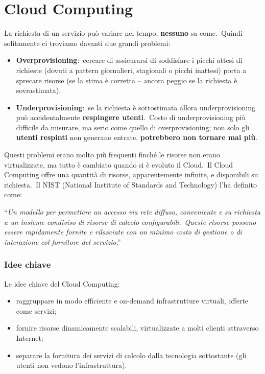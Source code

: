 \section{Cloud Computing}
La richiesta di un servizio può variare nel tempo, \textbf{nessuno} sa come.\
Quindi solitamente ci troviamo davanti due grandi problemi:
\begin{itemize}
    \item \textbf{Overprovisioning}:\ cercare di assicurarsi di soddisfare i picchi attesi di richieste (dovuti a pattern giornalieri, stagionali o picchi inattesi) porta a sprecare risorse (se la stima è corretta – ancora peggio se la richiesta è sovrastimata).
    \item \textbf{Underprovisioning}:\ se la richiesta è sottostimata allora underprovisioning può accidentalmente \textbf{respingere utenti}.\ Costo di underprovisioning più difficile da misurare, ma serio come quello di overprovisioning; non solo gli \textbf{utenti respinti} non generano entrate, \textbf{potrebbero non tornare mai più}.
\end{itemize}
Questi problemi erano molto più frequenti finché le risorse non erano virtualizzate, ma tutto è cambiato quando si è evoluto il Cloud.\
Il Cloud Computing offre una quantità di risorse, apparentemente infinite, e disponibili su richiesta.\
Il NIST (National Institute of Standards and Technology) l'ha definito come:

\vspace{12pt}
\noindent``\textit{Un modello per permettere un accesso via rete diffuso, conveniente e su richiesta a un insieme condiviso di risorse di calcolo configurabili}.\
\textit{Queste risorse possono essere rapidamente fornite e rilasciate con un minimo costo di gestione o di interazione col fornitore del servizio}.''

\subsubsection{Idee chiave}
\noindent Le idee chiave del Cloud Computing:
\begin{itemize} %
    \item raggruppare in modo efficiente e on-demand infrastrutture virtuali, offerte come servizi;
    \item fornire risorse dinamicamente scalabili, virtualizzate a molti clienti attraverso Internet;
    \item separare la fornitura dei servizi di calcolo dalla tecnologia sottostante (gli utenti non vedono l'infrastruttura).
\end{itemize}

